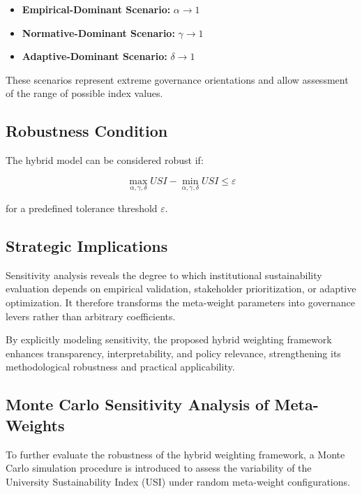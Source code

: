 \documentclass[11pt,a4paper]{article}
\begin{document}
\begin{itemize}
\item \textbf{Empirical-Dominant Scenario:} $\alpha \rightarrow 1$
\item \textbf{Normative-Dominant Scenario:} $\gamma \rightarrow 1$
\item \textbf{Adaptive-Dominant Scenario:} $\delta \rightarrow 1$
\end{itemize}

These scenarios represent extreme governance orientations and allow 
assessment of the range of possible index values.

\subsection{Robustness Condition}

The hybrid model can be considered robust if:

\begin{equation}
\max_{\alpha,\gamma,\delta} USI - 
\min_{\alpha,\gamma,\delta} USI
\leq \varepsilon
\end{equation}

for a predefined tolerance threshold $\varepsilon$.

\subsection{Strategic Implications}

Sensitivity analysis reveals the degree to which institutional 
sustainability evaluation depends on empirical validation, stakeholder 
prioritization, or adaptive optimization. It therefore transforms the 
meta-weight parameters into governance levers rather than arbitrary 
coefficients.

By explicitly modeling sensitivity, the proposed hybrid weighting 
framework enhances transparency, interpretability, and policy relevance, 
strengthening its methodological robustness and practical applicability.

\subsection{Monte Carlo Sensitivity Analysis of Meta-Weights}

To further evaluate the robustness of the hybrid weighting framework, a Monte Carlo simulation procedure is introduced to assess the variability of the University Sustainability Index (USI) under random meta-weight configurations.
\end{document}
